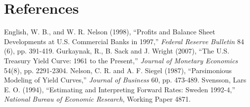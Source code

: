 \documentclass[12pt]{article}
\begin{document}
\section{References}

English, W. B., and W. R. Nelson (1998), ``Profits and Balance Sheet Developments at U.S. Commercial Banks in 1997,'' \textit{Federal Reserve Bulletin} 84 (6), pp. 391-419. \newline  
Gurkaynak, R., B. Sack and J. Wright (2007), ``The U.S. Treasury Yield Curve: 1961 to the Present,'' \textit{Journal of Monetary Economics} 54(8), pp. 2291-2304. \newline
Nelson, C. R. and A. F. Siegel (1987), ``Parsimonious Modeling of Yield Curves,'' \textit{Journal of Business} 60, pp. 473-489. \newline
Svensson, Lars E. O. (1994), ``Estimating and Interpreting Forward Rates: Sweden 1992-4,'' \textit{National Bureau of Economic Research}, Working Paper 4871.
\end{document}
